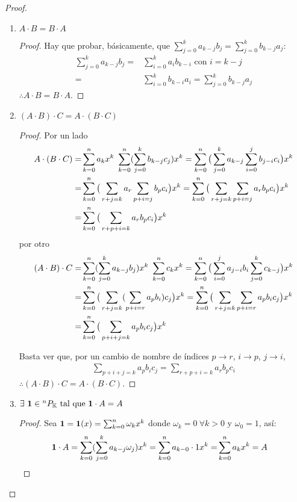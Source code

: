 \begin{proof}
\begin{enumerate}
 \item $ A\cdot B = B\cdot A $
 \begin{proof}
 Hay que probar, básicamente, que $\sum_{j=0}^k{a_{k-j}b_j} = \sum_{j=0}^k{b_{k-j}a_j}$:
  \begin{align*} 
   \sum_{j=0}^k{a_{k-j}b_j} =& \sum_{i=0}^k{a_ib_{k-i}} \text{ con } i = k - j \\
   =& \sum_{i=0}^k{ b_{k-i}a_i } = \sum_{j=0}^k { b_{k-j}a_j }
  \end{align*}
  $\therefore A\cdot B = B\cdot A$.
 \end{proof}
 
 \item $ (A \cdot B) \cdot C = A \cdot (B \cdot C) $
 \begin{proof}
 Por un lado
  \begin{align*}
  A \cdot (B \cdot C) =& \sum_{k=0}^n a_k x^k\ \sum_{k=0}^n  (\sum_{j=0}^k b_{k-j}c_j )  x^k = \sum_{k=0}^n \big(  \sum_{j=0}^ka_{k-j}\sum_{i=0}^jb_{j-i}c_i \big) x^k \\
  =& \sum_{k=0}^n \big(  \sum_{r+j=k}a_r\sum_{p+i=j}b_pc_i \big) x^k = \sum_{k=0}^n \big(  \sum_{r+j=k}\sum_{p+i=j}a_rb_pc_i \big) x^k \\
  =& \sum_{k=0}^n \big(  \sum_{r+p+i=k}a_rb_pc_i \big) x^k 
  \end{align*}
  por otro
    \begin{align*}
  (A \cdot B) \cdot C =& \sum_{k=0}^n  (\sum_{j=0}^k a_{k-j}b_j )  x^k\ \sum_{k=0}^n c_k x^k = \sum_{k=0}^n \big( \sum_{i=0}^ja_{j-i}b_i  \sum_{j=0}^kc_{k-j} \big) x^k \\
  =& \sum_{k=0}^n \big(  \sum_{r+j=k}(\sum_{p+i=r}a_pb_i) c_j \big) x^k = \sum_{k=0}^n \big(  \sum_{r+j=k}\sum_{p+i=r}a_pb_ic_j \big) x^k \\
  =& \sum_{k=0}^n \big(  \sum_{p+i+j=k}a_pb_ic_j \big) x^k 
  \end{align*}
  
  Basta ver que, por un cambio de nombre de índices $p \to r$, $i \to p$, $j \to i$,
  \begin{align*}
   \sum_{p+i+j=k}a_pb_ic_j = \sum_{r+p+i=k}a_rb_pc_i
  \end{align*}   
  $\therefore (A \cdot B) \cdot C = A \cdot (B \cdot C)$.
 \end{proof}
 
 \item $\exists \ \textbf{1} \in {^{n}P_{\mathbb{K}}} \text{ tal que } \textbf{1}\cdot A = A $
 \begin{proof}
 Sea $ \textbf{1} = \textbf{1}(x) = \sum_{k=0}^n \omega_k x^k$ donde $\omega_k = 0 \ \forall k > 0$ y $\omega_0 = 1$, así:
 \begin{align*}
  \textbf{1} \cdot A = \sum_{k=0}^n  (\sum_{j=0}^k a_{k-j}\omega_j )  x^k = \sum_{k=0}^n  a_{k-0} \cdot 1  x^k 
  =& \sum_{k=0}^n a_k x^k = A 
 \end{align*}
 \end{proof}
 

\end{enumerate}
\end{proof}
